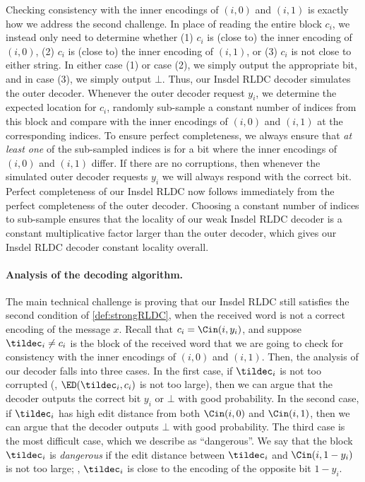 Checking consistency with the inner encodings of $(i,0)$ and $(i,1)$ is exactly how we address the second challenge.
In place of reading the entire block $c_i$, we instead only need to determine whether (1) $c_i$ is (close to) the inner encoding of $(i,0)$, (2) $c_i$ is (close to) the inner encoding of $(i,1)$, or (3) $c_i$ is not close to either string.
In either case (1) or case (2), we simply output the appropriate bit, and in case (3), we simply output $\bot$.
Thus, our Insdel RLDC decoder simulates the outer decoder. 
Whenever the outer decoder request $y_i$, we determine the expected location for $c_i$, randomly sub-sample a constant number of indices from this block and compare with the inner encodings of $(i,0)$ and $(i,1)$ at the corresponding indices. 
To ensure perfect completeness, we always ensure that {\em at least one} of the sub-sampled indices is for a bit where the inner encodings of $(i,0)$ and $(i,1)$ differ. 
If there are no corruptions, then whenever the simulated outer decoder requests $y_i$ we will always respond with the correct bit. 
Perfect completeness of our Insdel RLDC now follows immediately from the perfect completeness of the outer decoder. 
Choosing a constant number of indices to sub-sample ensures that the locality of our weak Insdel RLDC decoder is a constant multiplicative factor larger than the outer decoder, which gives our Insdel RLDC decoder constant locality overall.

\paragraph{Analysis of the decoding algorithm.} 
The main technical challenge is proving that our Insdel RLDC still satisfies the second condition of \cref{def:strongRLDC}, when the received word is not a correct encoding of the message $x$. 
Recall that $c_i = \Cin(i,y_i)$, and suppose $\tildec_i \neq c_i$ is the block of the received word that we are going to check for consistency with the inner encodings of $(i,0)$ and $(i,1)$.
Then, the analysis of our decoder falls into three cases.
In the first case, if $\tildec_i$ is not too corrupted (\ie, $\ED(\tildec_i, c_i)$ is not too large), then we can argue that the decoder outputs the correct bit $y_i$ or $\bot$ with good probability.
In the second case, if $\tildec_i$ has high edit distance from both $\Cin(i,0)$ and $\Cin(i,1)$, then we can argue that the decoder outputs $\bot$ with good probability.
The third case is the most difficult case, which we describe as ``dangerous''. 
We say that the block $\tildec_i$ is \emph{dangerous} if the edit distance between $\tildec_i$ and $\Cin(i,1-y_i)$ is not too large; \ie, $\tildec_i$ is close to the encoding of the opposite bit $1-y_i$.

